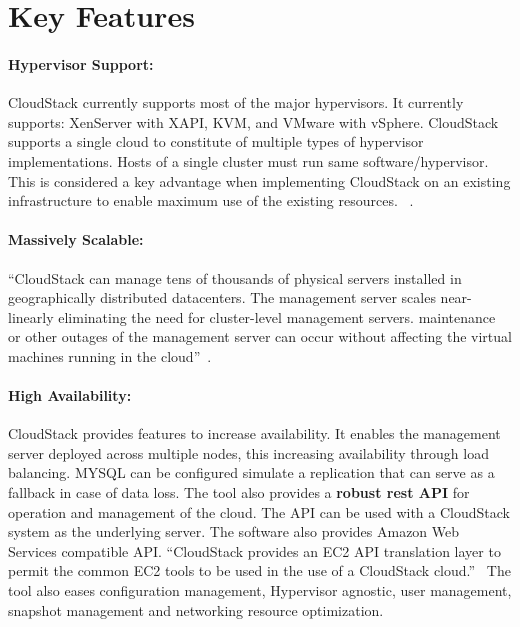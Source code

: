 \section{Key Features}

\paragraph{Hypervisor Support:} CloudStack currently supports most of 
the major hypervisors. It currently supports: XenServer with XAPI, KVM,
and VMware with vSphere.
CloudStack supports a single cloud to constitute of multiple types of
hypervisor implementations. Hosts of a single cluster must run same
software/hypervisor. This is considered a key advantage when
implementing CloudStack on an existing infrastructure to enable
maximum use of the existing resources. ~\cite{hid-sp18-417-www-cloudstack-hypervisor}.

\paragraph{Massively Scalable:}
``CloudStack can manage tens of thousands of physical servers installed
in geographically distributed datacenters. The management server
scales near-linearly eliminating the need for cluster-level management
servers. maintenance or other outages of the management server can
occur without affecting the virtual machines running in the cloud''~\cite{hid-sp18-417-www-cloudstack-scalability}.

\paragraph{High Availability:} CloudStack provides features to
increase availability. It enables the management server deployed
across multiple nodes, this increasing availability through load
balancing. MYSQL can be configured simulate a replication that can
serve as a fallback in case of data loss. The tool also provides a
{\bf robust rest API} for operation and management of the cloud. The
API can be used with a CloudStack system as the underlying server.
The software also provides Amazon Web Services compatible
API. ``CloudStack provides an EC2 API translation layer to permit the
common EC2 tools to be used in the use of a CloudStack
cloud.''~\cite{hid-sp18-417-www-cloudstack-aws} The tool also eases
configuration management, Hypervisor agnostic, user management,
snapshot management and networking resource optimization.

